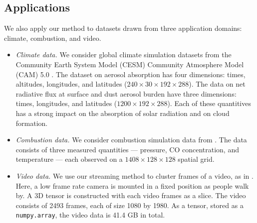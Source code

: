 \subsection{Applications}\label{s-real-data}

We also apply our method to datasets drawn from three application domains:
climate, combustion, and video.
\begin{itemize}
\item \emph{Climate data.}
We consider global climate simulation datasets from
the Community Earth System Model (CESM) Community Atmosphere Model (CAM) 5.0 \cite{hurrell2013community,kay2015community}.
The dataset on aerosol absorption has four dimensions:
times, altitudes, longitudes, and latitudes  ($240 \times 30 \times 192 \times 288$).
The data on net radiative flux at surface and dust aerosol burden have three dimensions:
times, longitudes, and latitudes ($1200 \times 192 \times 288$).
Each of these quantitives has a strong impact on the absorption of solar radiation and on cloud formation.

\item \emph{Combustion data.}
We consider combustion simulation data from \citet{lapointe2015differential}.
The data consists of three measured quantities ---
pressure, CO concentration, and temperature ---
each observed on a $1408 \times 128 \times 128$ spatial grid.

\item \emph{Video data.}
We use our streaming method to cluster frames of a video,
as in \cite{malik2018low}.
Here, a low frame rate camera is mounted in a fixed position as people walk by.
A 3D tensor is constructed with each video frames as a slice.
The video consists of 2493 frames, each of size 1080 by 1980.
As a tensor, stored as a \texttt{numpy.array}, the video data is 41.4 GB in total.
\end{itemize}

